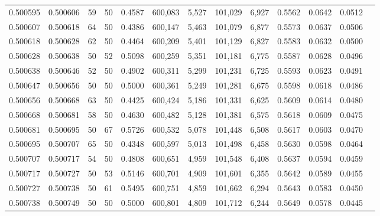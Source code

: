 \begin{tabular}{rrrrrrrrrrrrr}
0.500595 & 0.500606 &    59 &  50 &                                     0.4587 & 600,083 &   5,527 & 101,029 &   6,927 & 0.5562 & 0.0642 & 0.0512 \\
0.500607 & 0.500618 &    64 &  50 &                                     0.4386 & 600,147 &   5,463 & 101,079 &   6,877 & 0.5573 & 0.0637 & 0.0506 \\
0.500618 & 0.500628 &    62 &  50 &                                     0.4464 & 600,209 &   5,401 & 101,129 &   6,827 & 0.5583 & 0.0632 & 0.0500 \\
0.500628 & 0.500638 &    50 &  52 &                                     0.5098 & 600,259 &   5,351 & 101,181 &   6,775 & 0.5587 & 0.0628 & 0.0496 \\
0.500638 & 0.500646 &    52 &  50 &                                     0.4902 & 600,311 &   5,299 & 101,231 &   6,725 & 0.5593 & 0.0623 & 0.0491 \\
0.500647 & 0.500656 &    50 &  50 &                                     0.5000 & 600,361 &   5,249 & 101,281 &   6,675 & 0.5598 & 0.0618 & 0.0486 \\
0.500656 & 0.500668 &    63 &  50 &                                     0.4425 & 600,424 &   5,186 & 101,331 &   6,625 & 0.5609 & 0.0614 & 0.0480 \\
0.500668 & 0.500681 &    58 &  50 &                                     0.4630 & 600,482 &   5,128 & 101,381 &   6,575 & 0.5618 & 0.0609 & 0.0475 \\
0.500681 & 0.500695 &    50 &  67 &                                     0.5726 & 600,532 &   5,078 & 101,448 &   6,508 & 0.5617 & 0.0603 & 0.0470 \\
0.500695 & 0.500707 &    65 &  50 &                                     0.4348 & 600,597 &   5,013 & 101,498 &   6,458 & 0.5630 & 0.0598 & 0.0464 \\
0.500707 & 0.500717 &    54 &  50 &                                     0.4808 & 600,651 &   4,959 & 101,548 &   6,408 & 0.5637 & 0.0594 & 0.0459 \\
0.500717 & 0.500727 &    50 &  53 &                                     0.5146 & 600,701 &   4,909 & 101,601 &   6,355 & 0.5642 & 0.0589 & 0.0455 \\
0.500727 & 0.500738 &    50 &  61 &                                     0.5495 & 600,751 &   4,859 & 101,662 &   6,294 & 0.5643 & 0.0583 & 0.0450 \\
0.500738 & 0.500749 &    50 &  50 &                                     0.5000 & 600,801 &   4,809 & 101,712 &   6,244 & 0.5649 & 0.0578 & 0.0445 \\

\end{tabular}
